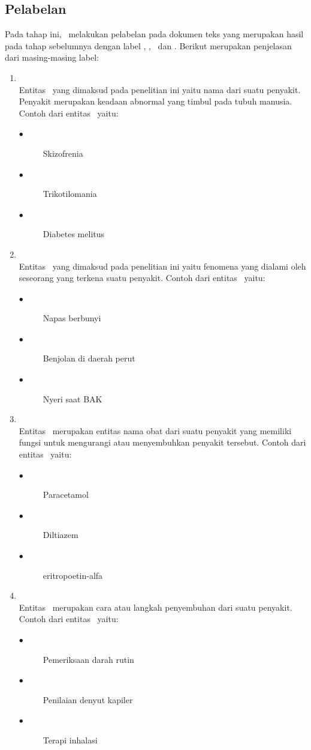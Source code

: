 	\subsection{Pelabelan}
	Pada tahap ini, \saya~melakukan pelabelan pada dokumen teks yang merupakan hasil pada tahap sebelumnya dengan label \disease, \symptom, \drug~dan \treatment. Berikut merupakan penjelasan dari masing-masing label:
	\begin{enumerate}
		\item \Disease\\
		Entitas \disease~yang dimaksud pada penelitian ini yaitu nama dari suatu penyakit. Penyakit merupakan keadaan abnormal yang timbul pada tubuh manusia. Contoh dari entitas \disease~yaitu:
		\begin{description}
			\item[$\bullet$] Skizofrenia
			\item[$\bullet$] Trikotilomania
			\item[$\bullet$] Diabetes melitus
		\end{description}
	
		\item \Symptom\\
		Entitas \symptom~yang dimaksud pada penelitian ini yaitu fenomena yang dialami oleh seseorang yang terkena suatu penyakit. Contoh dari entitas \symptom~yaitu:
		\begin{description}
			\item[$\bullet$] Napas berbunyi
			\item[$\bullet$] Benjolan di daerah perut
			\item[$\bullet$] Nyeri saat BAK
		\end{description}
	
		\item \Drug\\
		Entitas \drug~merupakan entitas nama obat dari suatu penyakit yang memiliki fungsi untuk mengurangi atau menyembuhkan penyakit tersebut. Contoh dari entitas \drug~yaitu:
		\begin{description}
			\item[$\bullet$] Paracetamol
			\item[$\bullet$] Diltiazem
			\item[$\bullet$] eritropoetin-alfa
		\end{description}
	
		\item \Treatment\\
		Entitas \treatment~merupakan cara atau langkah penyembuhan dari suatu penyakit. Contoh dari entitas \treatment~yaitu:
		\begin{description}
			\item[$\bullet$] Pemeriksaan darah rutin
			\item[$\bullet$] Penilaian denyut kapiler
			\item[$\bullet$] Terapi inhalasi
		\end{description}
	\end{enumerate}
		
